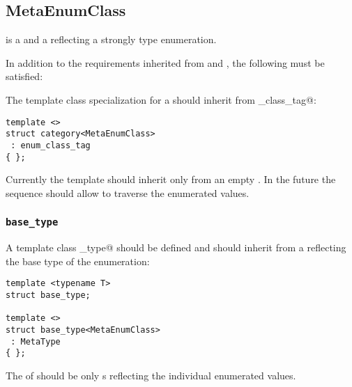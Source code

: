 \subsection{MetaEnumClass}
\label{concept-MetaEnumClass}

 is a  and a  reflecting a strongly type enumeration.

In addition to the requirements inherited from  and , the following must
be satisfied:

The \verb@category@ template class specialization for a  should
inherit from \verb@enum_class_tag@:

\begin{verbatim}
template <>
struct category<MetaEnumClass>
 : enum_class_tag
{ };
\end{verbatim}

Currently the \verb@members@ template should inherit only from an empty
. In the future the sequence should allow
to traverse the enumerated values.

\subsubsection{\texttt{base\_type}}

A template class \verb@base_type@ should be defined and should inherit from
a  reflecting the base type of the enumeration:

\begin{verbatim}
template <typename T>
struct base_type;

template <>
struct base_type<MetaEnumClass>
 : MetaType
{ };
\end{verbatim}

The \verb@members@ of  should be only  s
reflecting the individual enumerated values.

